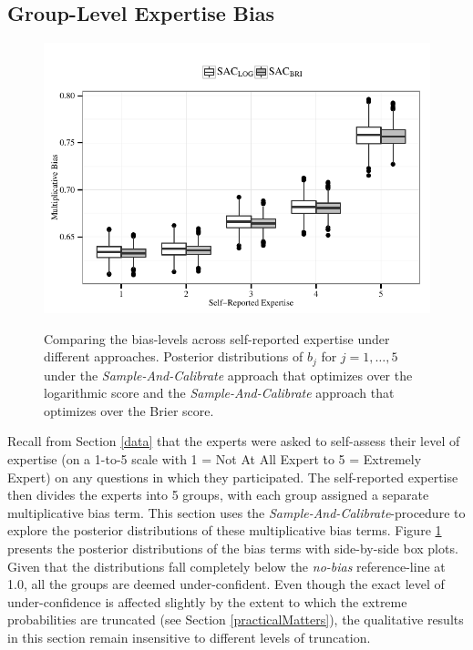 \documentclass[aoas, preprint]{imsart}
\numberwithin{equation}{section}
\theoremstyle{plain}
\begin{document}
\subsection{Group-Level Expertise Bias}
\label{ExpertBias}

\begin{figure}[!ht]
\vspace*{-1em} 
\includegraphics[width = \textwidth]{Figures/BiasesBoxplots}
\label{BiasesLOGBoxplots}
\vspace*{-2em} 

\caption[Optional caption for list of figures]{Comparing the bias-levels across self-reported expertise under different approaches. 
Posterior distributions of $b_j$ for $j = 1, \dots, 5$ under the \textit{Sample-And-Calibrate} approach that optimizes over the logarithmic score and the \textit{Sample-And-Calibrate} approach that optimizes over the Brier score.
}
\label{Biases}
\end{figure}


Recall from Section \ref{data} that the experts were asked to self-assess their level of expertise (on a 1-to-5 scale with 1 = Not At All Expert to 5 = Extremely Expert) on any questions in which they participated. The self-reported expertise then divides the experts into 5  groups, with each group assigned a separate multiplicative bias term. This section uses the \textit{Sample-And-Calibrate}-procedure to explore the posterior distributions of these multiplicative bias terms. Figure \ref{Biases} presents the posterior distributions of the bias terms with side-by-side box plots. Given that the distributions fall completely below the \textit{no-bias} reference-line at 1.0, all the groups are deemed under-confident. Even though the exact level of under-confidence is affected slightly by the extent to which the extreme probabilities are truncated (see Section \ref{practicalMatters}), the qualitative results in this section remain insensitive to different levels of truncation. 
\end{document}
